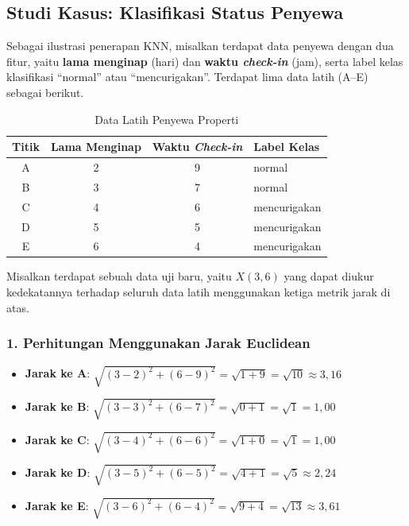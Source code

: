 \subsection{Studi Kasus: Klasifikasi Status Penyewa}
Sebagai ilustrasi penerapan KNN, misalkan terdapat data penyewa dengan dua fitur, yaitu \textbf{lama menginap} (hari) dan \textbf{waktu \textit{check-in}} (jam), serta label kelas klasifikasi ``normal'' atau ``mencurigakan''. Terdapat lima data latih (A--E) sebagai berikut.

\begin{table}[H]
    \centering
    \caption{Data Latih Penyewa Properti}
    \begin{tabular}{|c|c|c|l|}
        \hline
        \textbf{Titik} & \textbf{Lama Menginap} & \textbf{Waktu \textit{Check-in}} & \textbf{Label Kelas} \\
        \hline
        A & 2 & 9 & normal \\
        B & 3 & 7 & normal \\
        C & 4 & 6 & mencurigakan \\
        D & 5 & 5 & mencurigakan \\
        E & 6 & 4 & mencurigakan \\
        \hline
    \end{tabular}
\end{table}

Misalkan terdapat sebuah data uji baru, yaitu $X(3, 6)$ yang dapat diukur kedekatannya terhadap seluruh data latih menggunakan ketiga metrik jarak di atas.

\subsubsection*{1. Perhitungan Menggunakan Jarak Euclidean}
\begin{itemize}
    \item \textbf{Jarak ke A}: $\sqrt{(3 - 2)^2 + (6 - 9)^2} = \sqrt{1 + 9} = \sqrt{10} \approx 3{,}16$
    \item \textbf{Jarak ke B}: $\sqrt{(3 - 3)^2 + (6 - 7)^2} = \sqrt{0 + 1} = \sqrt{1} = 1{,}00$
    \item \textbf{Jarak ke C}: $\sqrt{(3 - 4)^2 + (6 - 6)^2} = \sqrt{1 + 0} = \sqrt{1} = 1{,}00$
    \item \textbf{Jarak ke D}: $\sqrt{(3 - 5)^2 + (6 - 5)^2} = \sqrt{4 + 1} = \sqrt{5} \approx 2{,}24$
    \item \textbf{Jarak ke E}: $\sqrt{(3 - 6)^2 + (6 - 4)^2} = \sqrt{9 + 4} = \sqrt{13} \approx 3{,}61$
\end{itemize}

